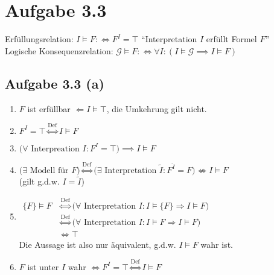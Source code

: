 \documentclass[12pt,a4paper]{article}
\begin{document}
\section*{Aufgabe 3.3}
Erfüllungsrelation: $I\models F:\Longleftrightarrow F^I=\top$ ``Interpretation $I$ erfüllt Formel $F$''\\
Logische Konsequenzrelation: $\mathcal{G}\models F:\Longleftrightarrow\forall I:(I\models\mathcal{G}\implies I\models F)$

\subsection*{Aufgabe 3.3 (a)}
\begin{enumerate}[label=(\arabic*)]
\item $F$ ist erfüllbar $\Longleftarrow I\models\top$, die Umkehrung gilt nicht.
\item $F^I=\top\stackrel{\text{Def}}{\Longleftrightarrow} I\models F$
\item $\big(\forall\text{ Interpreation }I:F^I=\top\big)\implies I\models F$
\item $\Big(\exists\text{ Modell für }F \Big)
\stackrel{\text{Def}}{\Longleftrightarrow}
\Big(\exists\text{ Interpretation }\tilde{I}:F^{\tilde{I}}=F\big)\not\Longleftrightarrow I\models F$\\
(gilt g.d.w. $I=\tilde{I}$)
\item $\begin{aligned}
\lbrace F\rbrace\models F
&\stackrel{\text{Def}}{\Longleftrightarrow}
\big(\forall\text{ Interpretation }I:I\models\lbrace F\rbrace\Rightarrow I\models F\big)\\
&\stackrel{\text{Def}}{\Longleftrightarrow}
\big(\forall\text{ Interpretation }I:I\models F\Rightarrow I\models F\big)\\
&\Longleftrightarrow\top
\end{aligned}$\\
Die Aussage ist also nur äquivalent, g.d.w. $I\models F$ wahr ist.
\item $F$ ist unter $I$ wahr $\Longleftrightarrow F^I=\top\stackrel{\text{Def}}{\Longleftrightarrow} I\models F$
\end{enumerate}
\end{document}
